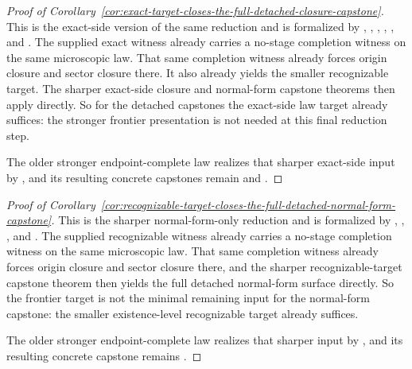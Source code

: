 \begin{proof}[Proof of Corollary~\ref{cor:exact-target-closes-the-full-detached-closure-capstone}]
\label{proof:cor:exact-target-closes-the-full-detached-closure-capstone}
This is the exact-side version of the same reduction and is formalized by
,
,
,
,
,
and
.
The supplied exact witness already carries a no-stage completion witness on
the same microscopic law. That same completion witness already forces origin
closure and sector closure there. It also already yields the smaller
recognizable target. The sharper exact-side closure and
normal-form capstone theorems then apply directly. So for the detached
capstones the exact-side law target already suffices: the stronger frontier
presentation is not needed at this final reduction step.

The older stronger endpoint-complete law realizes that sharper exact-side
input by ,
and its resulting concrete capstones remain
and
.
\end{proof}

\begin{proof}[Proof of Corollary~\ref{cor:recognizable-target-closes-the-full-detached-normal-form-capstone}]
\label{proof:cor:recognizable-target-closes-the-full-detached-normal-form-capstone}
This is the sharper normal-form-only reduction and is formalized by
,
,
,
and
.
The supplied recognizable witness already carries a no-stage completion witness
on the same microscopic law. That same completion witness already forces
origin closure and sector closure there, and the sharper recognizable-target
capstone theorem then yields the full detached normal-form surface directly.
So the frontier target is not the minimal remaining input for the normal-form
capstone: the smaller existence-level recognizable target already suffices.

The older stronger endpoint-complete law realizes that sharper input by
,
and its resulting concrete capstone remains
.
\end{proof}

